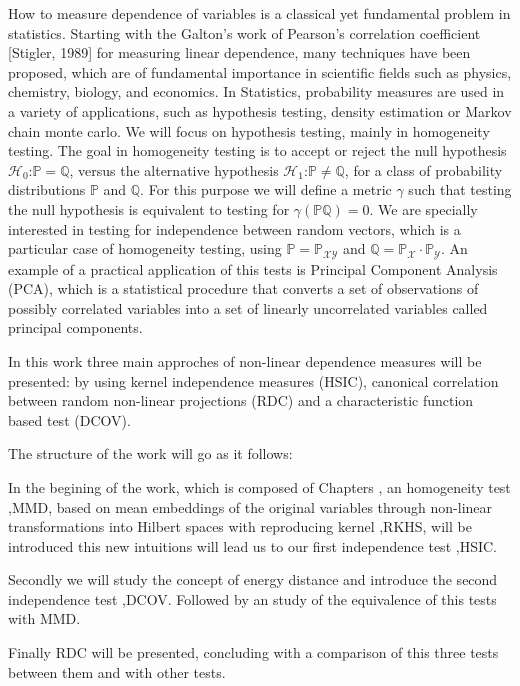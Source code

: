 How  to  measure  dependence  of  variables  is  a  classical yet fundamental problem in statistics.  Starting with the Galton’s work of Pearson’s correlation coefficient [Stigler, 1989] for measuring linear dependence,  many  techniques  have  been proposed, which are of fundamental importance in scientific fields such as physics, chemistry, biology, and economics.
In Statistics, probability measures are used in a variety of applications, such as hypothesis testing, density estimation or Markov chain monte carlo. We will focus on hypothesis testing, mainly in homogeneity testing. 
The goal in homogeneity testing is to accept or reject the null hypothesis $\mathcal{H}_{0}$:$\mathbb{P}=\mathbb{Q}$, versus the alternative hypothesis $\mathcal{H}_{1}$:$\mathbb{P}\neq\mathbb{Q}$, for a class of probability distributions $\mathbb{P}$ and $\mathbb{Q}$. For this purpose we will define a metric $\gamma$ such that testing the null hypothesis is equivalent to testing for $\gamma(\mathbb{P}\mathbb{Q}) = 0$. We are specially interested in testing for independence between random vectors, which is a particular case of homogeneity testing, using $\mathbb{P} = \mathbb{P}_{\mathcal{XY}}$ and $\mathbb{Q} = \mathbb{P}_{\mathcal{X}}\cdot\mathbb{P}_{\mathcal{Y}}$. An example of a practical application of this tests is Principal Component Analysis (PCA), which is a statistical procedure that converts a set of observations of possibly correlated variables into a set of linearly uncorrelated variables called principal components. 

In this work three main approches of non-linear dependence measures will be presented: by using kernel independence measures (HSIC), canonical correlation between random non-linear projections (RDC) and a characteristic function based test (DCOV).

The structure of the work will go as it follows:

In the begining of the work, which is composed of Chapters , an homogeneity test ,MMD, based on mean embeddings of the original variables through non-linear transformations into Hilbert spaces with reproducing kernel ,RKHS, will be introduced this new intuitions will lead us to our first independence test ,HSIC.

Secondly we will study the concept of energy distance and introduce the second independence test ,DCOV. Followed by an study of the equivalence of this tests with MMD.

Finally RDC will be presented, concluding with a comparison of this three tests between them and with other tests. 


